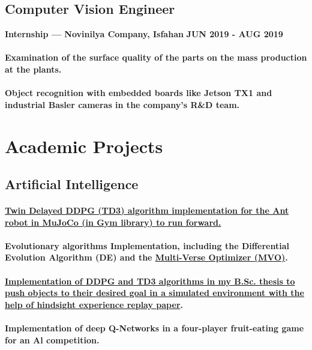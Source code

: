 \documentclass[a4paper]{article}
\begin{document}
        \subsection{Computer Vision Engineer}
        {\bfseries\small Internship — Novinilya Company, Isfahan}
        \hfill
        {\bfseries\small JUN 2019 - AUG 2019}\nopagebreak
        
        \paragraph{Examination of the surface quality of the parts on the mass production at the plants.}
        \paragraph{Object recognition with embedded boards like Jetson TX1 and industrial Basler cameras in the company's R\&D team.}

    \section{Academic Projects}

        \subsection{Artificial Intelligence}

            \paragraph{\href{https://github.com/ake1999/TD3_Ant_v4}{Twin Delayed DDPG (TD3) algorithm implementation for the Ant robot in MuJoCo (in Gym library) to run forward.}}
            \paragraph{Evolutionary algorithms Implementation, including the Differential Evolution Algorithm (DE) and the \href{https://github.com/ake1999/MVO_MATLAB}{Multi-Verse Optimizer (MVO)}.}
            \paragraph{\href{https://github.com/ake1999/aarm}{Implementation of DDPG and TD3 algorithms in my B.Sc. thesis to push objects to their desired goal in a simulated environment with the help of hindsight experience replay paper}.}
            \paragraph{Implementation of deep Q-Networks in a four-player fruit-eating game for an Al competition.}
\end{document}
